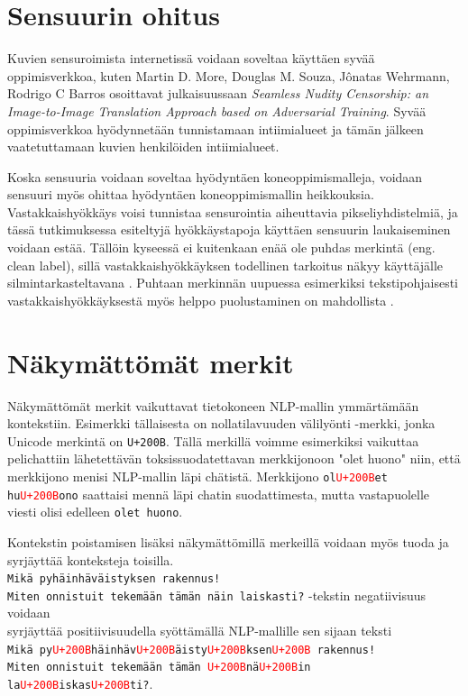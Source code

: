 \section{Sensuurin ohitus}
Kuvien sensuroimista internetissä voidaan soveltaa  käyttäen syvää oppimisverkkoa, kuten Martin D. More, Douglas M. Souza, Jônatas Wehrmann, Rodrigo C Barros osoittavat julkaisuussaan \textit{Seamless Nudity Censorship: an Image-to-Image Translation Approach based on Adversarial Training}. Syvää oppimisverkkoa hyödynnetään tunnistamaan intiimialueet ja tämän jälkeen vaatetuttamaan kuvien henkilöiden intiimialueet. \citep{censorship}

Koska sensuuria voidaan soveltaa hyödyntäen koneoppimismalleja, voidaan sensuuri myös ohittaa hyödyntäen koneoppimismallin heikkouksia. Vastakkaishyökkäys voisi tunnistaa sensurointia aiheuttavia pikseliyhdistelmiä, ja tässä tutkimuksessa esiteltyjä hyökkäystapoja käyttäen sensuurin laukaiseminen voidaan estää. Tällöin kyseessä ei kuitenkaan enää ole puhdas merkintä (eng. clean label), sillä vastakkaishyökkäyksen todellinen tarkoitus näkyy käyttäjälle silmintarkasteltavana \citep{triggerless}. Puhtaan merkinnän uupuessa esimerkiksi tekstipohjaisesti vastakkaishyökkäyksestä myös helppo puolustaminen on mahdollista \citep{pruthi2019}.

\section{Näkymättömät merkit}
Näkymättömät merkit vaikuttavat tietokoneen NLP-mallin ymmärtämään kontekstiin. Esimerkki tällaisesta on nollatilavuuden välilyönti -merkki, jonka Unicode merkintä on \texttt{U+200B}. Tällä merkillä voimme esimerkiksi vaikuttaa pelichattiin lähetettävän toksissuodatettavan merkkijonoon "olet huono" niin, että merkkijono menisi NLP-mallin läpi chätistä. Merkkijono \texttt{ol\textcolor{red}{U+200B}et hu\textcolor{red}{U+200B}ono} saattaisi mennä läpi chatin suodattimesta, mutta vastapuolelle viesti olisi edelleen \texttt{olet huono}. \citep{boucher2021bad}

Kontekstin poistamisen lisäksi näkymättömillä merkeillä voidaan myös tuoda ja syrjäyttää konteksteja toisilla.\\
\texttt{Mikä pyhäinhäväistyksen rakennus!\\
  Miten onnistuit tekemään tämän näin laiskasti?} -tekstin negatiivisuus voidaan\\
syrjäyttää positiivisuudella syöttämällä NLP-mallille sen sijaan teksti \\
\texttt{Mikä py\textcolor{red}{U+200B}häinhäv\textcolor{red}{U+200B}äisty\textcolor{red}{U+200B}ksen\textcolor{red}{U+200B} rakennus!\\
  Miten onnistuit tekemään tämän \textcolor{red}{U+200B}nä\textcolor{red}{U+200B}in la\textcolor{red}{U+200B}iskas\textcolor{red}{U+200B}ti?}. \citep{boucher2021bad}

